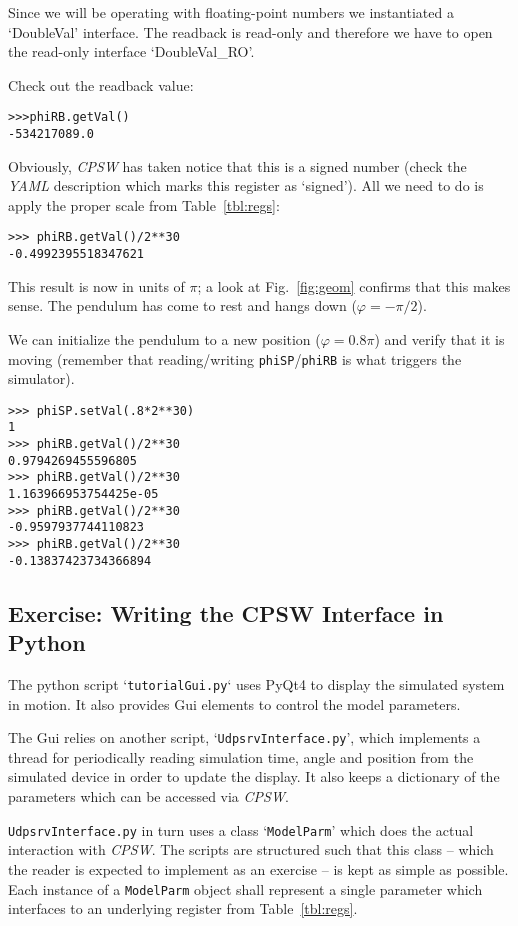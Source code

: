 \documentclass[10pt]{article}
\newcommand{\ita}[1]{\emph{#1}}
\newcommand{\cpsw}      {\ita {CPSW}}
\newcommand{\yaml}      {\ita {YAML}}
\newcommand{\cod}[1] {{\tt#1}}
\newcommand{\figr}[1]{Fig.~\ref{fig:#1}}
\begin{document}
Since we will be operating with floating-point numbers we instantiated
a `DoubleVal' interface. The readback is read-only and therefore we have
to open the read-only interface `DoubleVal\_RO'.

Check out the readback value:

\begin{verbatim}
>>>phiRB.getVal()
-534217089.0
\end{verbatim}

Obviously, \cpsw{} has taken notice that this is a signed number (check the
\yaml{} description which marks this register as `signed'). All we need to do
is apply the proper scale from Table~\ref{tbl:regs}:

\begin{verbatim}
>>> phiRB.getVal()/2**30
-0.4992395518347621
\end{verbatim}

This result is now in units of $\pi$; a look at \figr{geom} confirms that this
makes sense. The pendulum has come to rest and hangs down ($\varphi=-\pi/2$).

We can initialize the pendulum to a new position ($\varphi=0.8\pi$) and verify
that it is moving (remember that reading/writing \cod{phiSP}/\cod{phiRB} is what
triggers the simulator).

\begin{verbatim}
>>> phiSP.setVal(.8*2**30)
1
>>> phiRB.getVal()/2**30
0.9794269455596805
>>> phiRB.getVal()/2**30
1.163966953754425e-05
>>> phiRB.getVal()/2**30
-0.9597937744110823
>>> phiRB.getVal()/2**30
-0.13837423734366894
\end{verbatim}

\subsection{Exercise: Writing the CPSW Interface in Python}
The python script `\cod{tutorialGui.py}` uses PyQt4 to display the simulated
system in motion. It also provides Gui elements to control the model parameters.

The Gui relies on another script, `\cod{UdpsrvInterface.py}', which implements
a thread for periodically reading simulation time, angle and position from the
simulated device in order to update the display. It also keeps a dictionary of 
the parameters which can be accessed via \cpsw{}.

\cod{UdpsrvInterface.py} in turn uses a class `\cod{\mbox{ModelParm}}'
which does the actual interaction with \cpsw{}. The scripts are structured such
that this class -- which the reader is expected to implement as an exercise -- is kept
as simple as possible. Each instance of a \cod{\mbox{ModelParm}} object shall represent
a single parameter which interfaces to an underlying register from Table~\ref{tbl:regs}.
\end{document}
